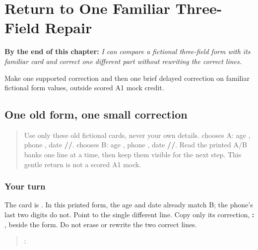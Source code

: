 
\chapter{Return to One Familiar Three-Field Repair}
\label{ch:pa-form-repair-r4}

\begin{chapteropening}
\textbf{By the end of this chapter:} \emph{I can compare a fictional three-field form with its familiar card and correct one different part without rewriting the correct lines.}

Make one supported correction and then one brief delayed correction on familiar fictional form values, outside scored A1 mock credit.
\end{chapteropening}

\section[\texorpdfstring{\pa{ਕ} / \pa{ਖ} (one familiar …)}{ਕ / ਖ (one familiar …)}]{One old form, one small correction}

\label{lesson:PA-R175-form-repair-again}



\begin{quote}
Use only these old fictional cards, never your own details. \textbf{} chooses A: age \textbf{}, phone \textbf{ }, date \textbf{//}. \textbf{} chooses B: age \textbf{}, phone \textbf{ }, date \textbf{//}. Read the printed A/B banks one line at a time, then keep them visible for the next step. This gentle return is not a scored A1 mock.
\end{quote}

\subsection*{Your turn}
The card is \textbf{}. In this printed form, the age and date already match B; the phone's last two digits do not. Point to the single different line. Copy only its correction, \textbf{:  }, beside the form. Do not erase or rewrite the two correct lines.

\begin{quote}
: 
\end{quote}

